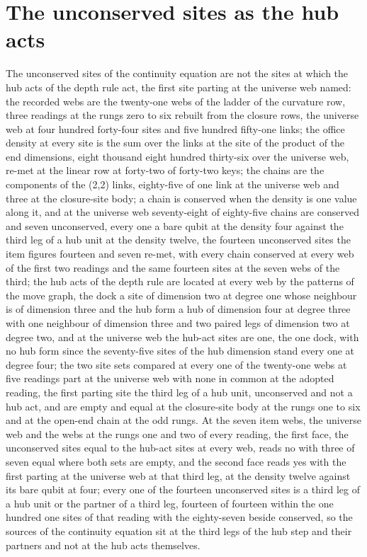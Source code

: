 \section{The unconserved sites as the hub acts}\label{mod:IV-15-unconserved-sites-as-the-hub-acts}
\begin{chwall}\label{box:IV-15-unconserved-sites-as-the-hub-acts:1}
The unconserved sites of the continuity equation are not the sites at which the hub acts of the depth rule act, the first site parting at the universe web named: the recorded webs are the twenty-one webs of the ladder of the curvature row, three readings at the rungs zero to six rebuilt from the closure rows, the universe web at four hundred forty-four sites and five hundred fifty-one links; the office density at every site is the sum over the links at the site of the product of the end dimensions, eight thousand eight hundred thirty-six over the universe web, re-met at the linear row at forty-two of forty-two keys; the chains are the components of the (2,2) links, eighty-five of one link at the universe web and three at the closure-site body; a chain is conserved when the density is one value along it, and at the universe web seventy-eight of eighty-five chains are conserved and seven unconserved, every one a bare qubit at the density four against the third leg of a hub unit at the density twelve, the fourteen unconserved sites the item figures fourteen and seven re-met, with every chain conserved at every web of the first two readings and the same fourteen sites at the seven webs of the third; the hub acts of the depth rule are located at every web by the patterns of the move graph, the dock a site of dimension two at degree one whose neighbour is of dimension three and the hub form a hub of dimension four at degree three with one neighbour of dimension three and two paired legs of dimension two at degree two, and at the universe web the hub-act sites are one, the one dock, with no hub form since the seventy-five sites of the hub dimension stand every one at degree four; the two site sets compared at every one of the twenty-one webs at five readings part at the universe web with none in common at the adopted reading, the first parting site the third leg of a hub unit, unconserved and not a hub act, and are empty and equal at the closure-site body at the rungs one to six and at the open-end chain at the odd rungs. At the seven item webs, the universe web and the webs at the rungs one and two of every reading, the first face, the unconserved sites equal to the hub-act sites at every web, reads no with three of seven equal where both sets are empty, and the second face reads yes with the first parting at the universe web at that third leg, at the density twelve against its bare qubit at four; every one of the fourteen unconserved sites is a third leg of a hub unit or the partner of a third leg, fourteen of fourteen within the one hundred one sites of that reading with the eighty-seven beside conserved, so the sources of the continuity equation sit at the third legs of the hub step and their partners and not at the hub acts themselves.

\end{chwall}
